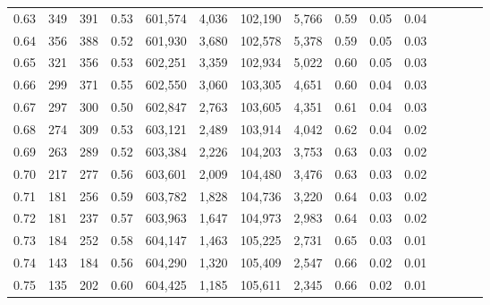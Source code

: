 \begin{tabular}{rrrcrrrrrrrrrrr}
0.63 &     349 &    391 &                                       0.53 &  601,574 &    4,036 &  102,190 &    5,766 &  0.59 &  0.05 &                         0.04 \\
0.64 &     356 &    388 &                                       0.52 &  601,930 &    3,680 &  102,578 &    5,378 &  0.59 &  0.05 &                         0.03 \\
0.65 &     321 &    356 &                                       0.53 &  602,251 &    3,359 &  102,934 &    5,022 &  0.60 &  0.05 &                         0.03 \\
0.66 &     299 &    371 &                                       0.55 &  602,550 &    3,060 &  103,305 &    4,651 &  0.60 &  0.04 &                         0.03 \\
0.67 &     297 &    300 &                                       0.50 &  602,847 &    2,763 &  103,605 &    4,351 &  0.61 &  0.04 &                         0.03 \\
0.68 &     274 &    309 &                                       0.53 &  603,121 &    2,489 &  103,914 &    4,042 &  0.62 &  0.04 &                         0.02 \\
0.69 &     263 &    289 &                                       0.52 &  603,384 &    2,226 &  104,203 &    3,753 &  0.63 &  0.03 &                         0.02 \\
0.70 &     217 &    277 &                                       0.56 &  603,601 &    2,009 &  104,480 &    3,476 &  0.63 &  0.03 &                         0.02 \\
0.71 &     181 &    256 &                                       0.59 &  603,782 &    1,828 &  104,736 &    3,220 &  0.64 &  0.03 &                         0.02 \\
0.72 &     181 &    237 &                                       0.57 &  603,963 &    1,647 &  104,973 &    2,983 &  0.64 &  0.03 &                         0.02 \\
0.73 &     184 &    252 &                                       0.58 &  604,147 &    1,463 &  105,225 &    2,731 &  0.65 &  0.03 &                         0.01 \\
0.74 &     143 &    184 &                                       0.56 &  604,290 &    1,320 &  105,409 &    2,547 &  0.66 &  0.02 &                         0.01 \\
0.75 &     135 &    202 &                                       0.60 &  604,425 &    1,185 &  105,611 &    2,345 &  0.66 &  0.02 &                         0.01 \\

\end{tabular}
